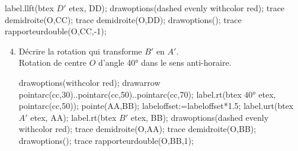 \begin{corrige}
\begin{enumerate}
\begin{Geometrie}[CoinHD={(7u,6u)}]
                label.llft(btex $D'$ etex, DD);
                drawoptions(dashed evenly withcolor red);
                trace demidroite(O,CC);
                trace demidroite(O,DD);
                drawoptions();
                trace rapporteurdouble(O,CC,-1);
            \end{Geometrie}
    \end{enumerate}
    \Coupe 
    \begin{enumerate}            
        \setcounter{enumi}{3}            
        \item Décrire la rotation qui transforme $B'$ en $A'$.\\
        {\red Rotation de centre $O$ d'angle \ang{40} dans le sens anti-horaire.}\\
            \begin{Geometrie}[CoinHD={(7u,6u)}]    
                \enonceTroisiemeGTroisExoDix
                drawoptions(withcolor red);
                drawarrow pointarc(cc,30)..pointarc(cc,50)..pointarc(cc,70);
                label.rt(btex $\ang{40}$ etex, pointarc(cc,50));    
                pointe(AA,BB);
                labeloffset:=labeloffset*1.5;
                label.urt(btex $A'$ etex, AA);
                label.rt(btex $B'$ etex, BB);
                drawoptions(dashed evenly withcolor red);
                trace demidroite(O,AA);
                trace demidroite(O,BB);
                drawoptions();
                trace rapporteurdouble(O,BB,1);
            \end{Geometrie}
    \end{enumerate}    
\end{corrige}

